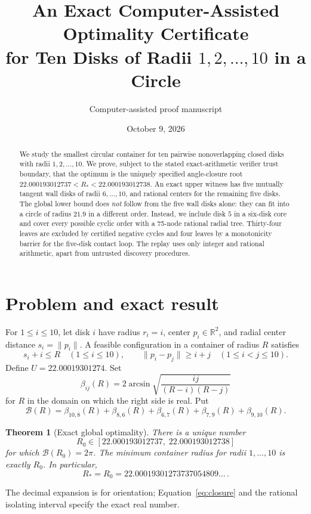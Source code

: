 \documentclass[11pt,a4paper]{article}
\title{An Exact Computer-Assisted Optimality Certificate\\for Ten Disks of Radii $1,2,\ldots,10$ in a Circle}
\author{Computer-assisted proof manuscript}
\date{October 9, 2026}
\newtheorem{theorem}{Theorem}
\newcommand{\Rstar}{R_*}
\newcommand{\Rcap}{U}
\newcommand{\norm}[1]{\lVert#1\rVert}
\begin{document}
\maketitle
\begin{abstract}
We study the smallest circular container for ten pairwise nonoverlapping
closed disks with radii $1,2,\ldots,10$.  We prove, subject to the stated
exact-arithmetic verifier trust boundary, that the optimum is the uniquely
specified angle-closure root
$22.000193012737<R_*<22.000193012738$.
An exact upper witness has five mutually tangent wall disks of radii
$6,\ldots,10$, and rational centers for the remaining five disks.
The global lower bound does \emph{not} follow from the five wall disks alone:
they can fit into a circle of radius $21.9$ in a different order.
Instead, we include disk $5$ in a six-disk core and cover every possible
cyclic order with a 75-node rational radial tree.  Thirty-four leaves are
excluded by certified negative cycles and four leaves by a monotonicity
barrier for the five-disk contact loop.  The replay uses only integer and
rational arithmetic, apart from untrusted discovery procedures.
\end{abstract}

\section{Problem and exact result}
For $1\le i\le10$, let disk $i$ have radius $r_i=i$, center
$p_i\in\mathbb R^2$, and radial center distance $s_i=\norm{p_i}$.
A feasible configuration in a container of radius $R$ satisfies
\begin{equation}\label{eq:constraints}
  s_i+i\le R \quad(1\le i\le10),\qquad
  \norm{p_i-p_j}\ge i+j \quad(1\le i<j\le10).
\end{equation}
Define $\Rcap=22.00019301274$.  Set
\begin{equation}\label{eq:beta}
 \beta_{ij}(R)=2\arcsin\sqrt{\frac{ij}{(R-i)(R-j)}}
\end{equation}
for $R$ in the domain on which the right side is real.  Put
\begin{equation}\label{eq:closure}
 \mathcal B(R)=\beta_{10,8}(R)+\beta_{8,6}(R)
       +\beta_{6,7}(R)+\beta_{7,9}(R)+\beta_{9,10}(R).
\end{equation}
\begin{theorem}[Exact global optimality]\label{thm:main}
There is a unique number
\[
 R_0\in\left[22.000193012737,\;22.000193012738\right]
\]
for which $\mathcal B(R_0)=2\pi$.  The minimum container radius for
radii $1,\ldots,10$ is exactly $R_0$.  In particular,
\[
 \boxed{\Rstar=R_0=22.00019301273737054809\ldots}\,.
\]
\end{theorem}
The decimal expansion is for orientation; Equation~\eqref{eq:closure}
and the rational isolating interval specify the exact real number.
\end{document}
